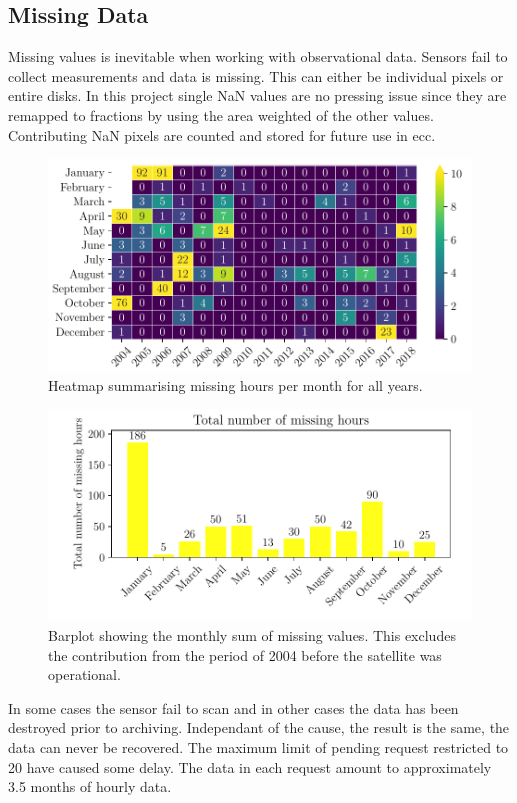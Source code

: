 \subsection{Missing Data} \label{sec:missing_values}
Missing values is inevitable when working with observational data. Sensors fail to collect measurements and data is missing. This can either be individual pixels or entire disks. In this project single NaN values are no pressing issue since they are remapped to fractions by using the area weighted of the other values. Contributing NaN pixels are counted and stored for future use in \acrshort{ecc}.
\begin{figure}
    \centering
    \includegraphics[scale = 1.0]{python_figs/heatmap_missing_values.pdf}
    \caption{Heatmap summarising missing hours per month for all years.}
    \label{fig:heatmap_missing_values}
\end{figure}
\begin{figure}
    \centering
    \includegraphics[scale = 1.0]{python_figs/heatmap_missing_values_monthly_sum.pdf}
    \caption{Barplot showing the monthly sum of missing values. This excludes the contribution from the period of 2004 before the satellite was operational.}
    \label{fig:barplot_missing_values}
\end{figure}
In some cases the sensor fail to scan and in other cases the data has been destroyed prior to archiving. Independant of the cause, the result is the same, the data can never be recovered. %
The maximum limit of pending request restricted to 20 have caused some delay. The data in each request amount to approximately 3.5 months of hourly data. 

